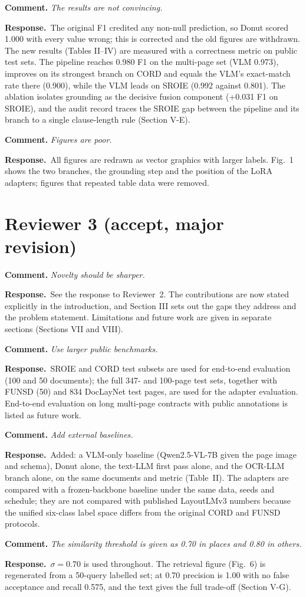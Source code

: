 \documentclass[11pt]{article}
\newcommand{\rc}[1]{\par\medskip\textbf{Comment.} \emph{#1}\par}
\newcommand{\rr}{\textbf{Response.}\ }
\begin{document}
\rc{The results are not convincing.}
\rr The original F1 credited any non-null prediction, so Donut scored 1.000 with every value wrong; this is corrected and the old figures are withdrawn. The new results (Tables II--IV) are measured with a correctness metric on public test sets. The pipeline reaches 0.980 F1 on the multi-page set (VLM 0.973), improves on its strongest branch on CORD and equals the VLM's exact-match rate there (0.900), while the VLM leads on SROIE (0.992 against 0.801). The ablation isolates grounding as the decisive fusion component (+0.031 F1 on SROIE), and the audit record traces the SROIE gap between the pipeline and its branch to a single clause-length rule (Section V-E).

\rc{Figures are poor.}
\rr All figures are redrawn as vector graphics with larger labels. Fig.~1 shows the two branches, the grounding step and the position of the LoRA adapters; figures that repeated table data were removed.

\section*{Reviewer 3 (accept, major revision)}

\rc{Novelty should be sharper.}
\rr See the response to Reviewer~2. The contributions are now stated explicitly in the introduction, and Section III sets out the gaps they address and the problem statement. Limitations and future work are given in separate sections (Sections VII and VIII).

\rc{Use larger public benchmarks.}
\rr SROIE and CORD test subsets are used for end-to-end evaluation (100 and 50 documents); the full 347- and 100-page test sets, together with FUNSD (50) and 834 DocLayNet test pages, are used for the adapter evaluation. End-to-end evaluation on long multi-page contracts with public annotations is listed as future work.

\rc{Add external baselines.}
\rr Added: a VLM-only baseline (Qwen2.5-VL-7B given the page image and schema), Donut alone, the text-LLM first pass alone, and the OCR-LLM branch alone, on the same documents and metric (Table~II). The adapters are compared with a frozen-backbone baseline under the same data, seeds and schedule; they are not compared with published LayoutLMv3 numbers because the unified six-class label space differs from the original CORD and FUNSD protocols.

\rc{The similarity threshold is given as 0.70 in places and 0.80 in others.}
\rr $\sigma = 0.70$ is used throughout. The retrieval figure (Fig.~6) is regenerated from a 50-query labelled set; at 0.70 precision is 1.00 with no false acceptance and recall 0.575, and the text gives the full trade-off (Section V-G).
\end{document}
